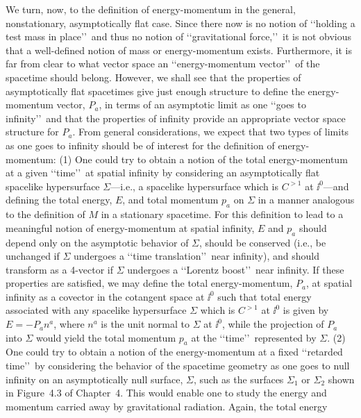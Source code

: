 We turn, now, to the definition of energy-momentum in the general, nonstationary,
asymptotically flat case. Since there now is no notion of \lq\lq holding a test mass in
place\rq\rq\ and thus no notion of \lq\lq gravitational force,\rq\rq\ it is not obvious that a
well-defined notion of mass or energy-momentum exists. Furthermore, it is far from
clear to what vector space an \lq\lq energy-momentum vector\rq\rq\ of the spacetime
should belong. However, we shall see that the properties of asymptotically flat
spacetimes give just enough structure to define the energy-momentum vector, \(P_a\),
in terms of an asymptotic limit as one \lq\lq goes to infinity\rq\rq\ and that the
properties of infinity provide an appropriate vector space structure for \(P_a\). From
general considerations, we expect that two types of limits as one goes to infinity
should be of interest for the definition of energy-momentum: (1) One could try to
obtain a notion of the total energy-momentum at a given \lq\lq time\rq\rq\ at spatial
infinity by considering an asymptotically flat spacelike hypersurface \(\Sigma\)---i.e.,
a spacelike hypersurface which is \(C^{>1}\) at \(\ii^0\)---and defining the total energy,
\(E\), and total momentum \(p_a\) on \(\Sigma\) in a manner analogous to the
definition of \(M\) in a stationary spacetime. For this definition to lead to a
meaningful notion of energy-momentum at spatial infinity, \(E\) and \(p_a\) should
depend only on the asymptotic behavior of \(\Sigma\), should be conserved (i.e., be
unchanged if \(\Sigma\) undergoes a \lq\lq time translation\rq\rq\ near infinity), and
should transform as a 4-vector if \(\Sigma\) undergoes a \lq\lq Lorentz boost\rq\rq\ near
infinity. If these properties are satisfied, we may define the total energy-momentum,
\(P_a\), at spatial infinity as a covector in the cotangent space at \(\ii^0\) such that
total energy associated with any spacelike hypersurface \(\Sigma\) which is
\(C^{>1}\) at \(\ii^0\) is given by \(E=-P_an^a\), where \(n^a\) is the unit normal to
\(\Sigma\) at \(\ii^0\), while the projection of \(P_a\) into \(\Sigma\) would yield the
total momentum \(p_a\) at the \lq\lq time\rq\rq\ represented by \(\Sigma\). (2) One could
try to obtain a notion of the energy-momentum at a fixed \lq\lq retarded time\rq\rq\ by
considering the behavior of the spacetime geometry as one goes to null infinity on
an asymptotically null surface, \(\Sigma\), such as the surfaces \(\Sigma_1\) or
\(\Sigma_2\) shown in Figure~4.3 of Chapter~4. This would enable one to study the
energy and momentum carried away by gravitational radiation. Again, the total energy
